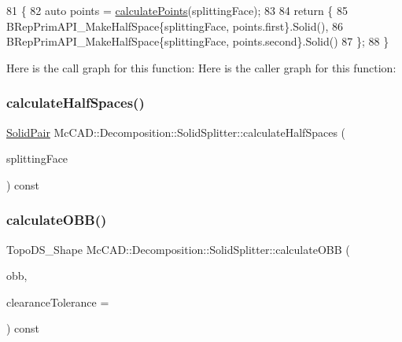 \begin{DoxyCode}
81                                                \{
82     \textcolor{keyword}{auto} points = \hyperlink{classMcCAD_1_1Decomposition_1_1SolidSplitter_ab9be5e10e5544c26055144c72de0e499}{calculatePoints}(splittingFace);
83 
84     \textcolor{keywordflow}{return} \{
85         BRepPrimAPI\_MakeHalfSpace\{splittingFace, points.first\}.Solid(),
86         BRepPrimAPI\_MakeHalfSpace\{splittingFace, points.second\}.Solid()
87     \};
88 \}
\end{DoxyCode}
Here is the call graph for this function\+:
Here is the caller graph for this function\+:
\mbox{\label{classMcCAD_1_1Decomposition_1_1SolidSplitter_acf1e0b4909357eb0fa1ea6aaa260378d}} 
\subsubsection{\texorpdfstring{calculate\+Half\+Spaces()}{calculateHalfSpaces()}\hspace{0.1cm}{\footnotesize\ttfamily [2/2]}}
{\footnotesize\ttfamily \hyperlink{classMcCAD_1_1Decomposition_1_1SolidSplitter_a89a95e43f161348b456a72c9acce0826}{Solid\+Pair} Mc\+C\+A\+D\+::\+Decomposition\+::\+Solid\+Splitter\+::calculate\+Half\+Spaces (\begin{DoxyParamCaption}\item[{const Topo\+D\+S\+\_\+\+Face \&}]{splitting\+Face }\end{DoxyParamCaption}) const\hspace{0.3cm}{\ttfamily [private]}}

\mbox{\label{classMcCAD_1_1Decomposition_1_1SolidSplitter_a24c086a0f489167076acfee3bd61d991}} 
\subsubsection{\texorpdfstring{calculate\+O\+B\+B()}{calculateOBB()}\hspace{0.1cm}{\footnotesize\ttfamily [1/2]}}
{\footnotesize\ttfamily Topo\+D\+S\+\_\+\+Shape Mc\+C\+A\+D\+::\+Decomposition\+::\+Solid\+Splitter\+::calculate\+O\+BB (\begin{DoxyParamCaption}\item[{Bnd\+\_\+\+O\+BB}]{obb,  }\item[{Standard\+\_\+\+Real}]{clearance\+Tolerance = {} }\end{DoxyParamCaption}) const}

